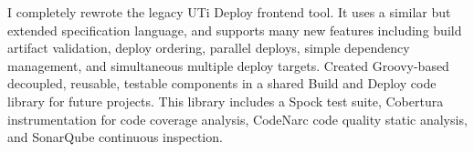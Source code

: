 {
  I completely rewrote the legacy UTi Deploy frontend tool. It uses a similar but extended specification language, and supports many new features including build artifact validation, deploy ordering, parallel deploys, simple dependency management, and simultaneous multiple deploy targets. Created Groovy-based decoupled, reusable, testable components in a shared Build and Deploy code library for future projects. This library includes a Spock test suite, Cobertura instrumentation for code coverage analysis, CodeNarc code quality static analysis, and SonarQube continuous inspection.
}
